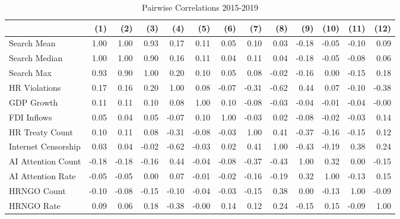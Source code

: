 \begin{table}[ht]
\centering
\begin{tabular}{|l|rrrrrrrrrrrr|}
  \hline
 & (1) & (2) & (3) & (4) & (5) & (6) & (7) & (8) & (9) & (10) & (11) & (12) \\ 
  \hline
Search Mean & 1.00 & 1.00 & 0.93 & 0.17 & 0.11 & 0.05 & 0.10 & 0.03 & -0.18 & -0.05 & -0.10 & 0.09 \\ 
  Search Median & 1.00 & 1.00 & 0.90 & 0.16 & 0.11 & 0.04 & 0.11 & 0.04 & -0.18 & -0.05 & -0.08 & 0.06 \\ 
  Search Max & 0.93 & 0.90 & 1.00 & 0.20 & 0.10 & 0.05 & 0.08 & -0.02 & -0.16 & 0.00 & -0.15 & 0.18 \\ 
  HR Violations & 0.17 & 0.16 & 0.20 & 1.00 & 0.08 & -0.07 & -0.31 & -0.62 & 0.44 & 0.07 & -0.10 & -0.38 \\ 
  GDP Growth & 0.11 & 0.11 & 0.10 & 0.08 & 1.00 & 0.10 & -0.08 & -0.03 & -0.04 & -0.01 & -0.04 & -0.00 \\ 
  FDI Inflows & 0.05 & 0.04 & 0.05 & -0.07 & 0.10 & 1.00 & -0.03 & 0.02 & -0.08 & -0.02 & -0.03 & 0.14 \\ 
  HR Treaty Count & 0.10 & 0.11 & 0.08 & -0.31 & -0.08 & -0.03 & 1.00 & 0.41 & -0.37 & -0.16 & -0.15 & 0.12 \\ 
  Internet Censorship & 0.03 & 0.04 & -0.02 & -0.62 & -0.03 & 0.02 & 0.41 & 1.00 & -0.43 & -0.19 & 0.38 & 0.24 \\ 
  AI Attention Count & -0.18 & -0.18 & -0.16 & 0.44 & -0.04 & -0.08 & -0.37 & -0.43 & 1.00 & 0.32 & 0.00 & -0.15 \\ 
  AI Attention Rate & -0.05 & -0.05 & 0.00 & 0.07 & -0.01 & -0.02 & -0.16 & -0.19 & 0.32 & 1.00 & -0.13 & 0.15 \\ 
  HRNGO Count & -0.10 & -0.08 & -0.15 & -0.10 & -0.04 & -0.03 & -0.15 & 0.38 & 0.00 & -0.13 & 1.00 & -0.09 \\ 
  HRNGO Rate & 0.09 & 0.06 & 0.18 & -0.38 & -0.00 & 0.14 & 0.12 & 0.24 & -0.15 & 0.15 & -0.09 & 1.00 \\ 
   \hline
\end{tabular}
\caption{Pairwise Correlations 2015-2019} 
\end{table}
